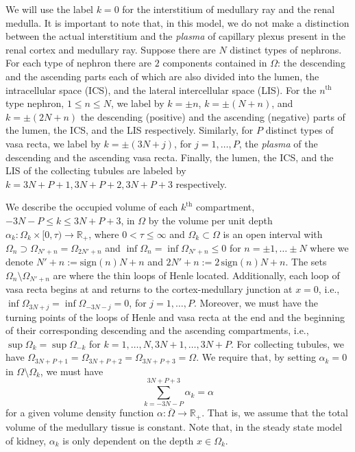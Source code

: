 \documentclass{article}
\begin{document}
We will use the label
$k=0$ for the interstitium of medullary ray and the renal medulla.
It is important to note that, in this model, we do not make a distinction between the actual interstitium and the \textit{plasma} of capillary plexus present in the renal cortex and medullary ray.
Suppose there are $N$ distinct types of nephrons.
For each type of nephron there are $2$ components contained in $\Omega$: the descending and the ascending parts each of which are also divided into the lumen, the intracellular space (ICS), and the lateral intercellular space (LIS).
For the $n^{\mathrm{th}}$ type nephron, $1\leq n\leq N$, we label by $k=\pm n$, $k=\pm(N+n)$, and $k=\pm(2N+n)$ the descending (positive) and the ascending (negative) parts of the lumen, the ICS, and the LIS respectively.
Similarly, for $P$ distinct types of vasa recta, we label by $k=\pm(3N+j)$, for $j=1,\dots,P$, the \textit{plasma} of the descending and the ascending vasa recta.
Finally, the lumen, the ICS, and the LIS of the collecting tubules are labeled by $k=3N+P+1,3N+P+2,3N+P+3$ respectively.

We describe the occupied volume of each $k^{\mathrm{th}}$ compartment, $-3N-P\leq k\leq 3N+P+3$, in $\Omega$ by the volume per unit depth $\alpha_k:\Omega_k\times [0,\tau)\to \mathbb{R}_+$, where $0<\tau\leq \infty$ and $\Omega_k\subset\Omega$ is an open interval with $\Omega_{n} \supset \Omega_{N'+n} = \Omega_{2N'+n}$ and $\inf\Omega_n = \inf\Omega_{N'+n}\leq 0$ for $n=\pm 1,\dots\pm N$ where we denote $N'+n := \mathrm{sign}(n)N+n$ and $2N'+n := 2\, \mathrm{sign}(n)N+n$.
The sets $\Omega_n\setminus \Omega_{N'+n}$ are where the thin loops of Henle located.
Additionally, each loop of vasa recta begins at and returns to the cortex-medullary junction at $x=0$, i.e., $\inf \Omega_{3N+j} = \inf \Omega_{-3N-j}=0$, for $j=1,\dots,P$.
Moreover, we must have the turning points of the loops of Henle and vasa recta at the end and the beginning of their corresponding descending and the ascending compartments, i.e., $\sup\Omega_k = \sup\Omega_{-k}$ for $k=1,\dots,N,3N+1,\dots,3N+P$.
For collecting tubules, we have $\Omega_{3N+P+1}=\Omega_{3N+P+2}=\Omega_{3N+P+3}=\Omega$.
We require that, by setting $\alpha_k=0$ in $\Omega\setminus\Omega_k$, we must have
\begin{equation}\label{eq:const_vol}
    \sum_{k=-3N-P}^{3N+P+3} \alpha_k = \alpha
\end{equation}
    for a given volume density function $\alpha:\overline{\Omega}\to\mathbb{R}_+$.
That is, we assume that the total volume of the medullary tissue is constant.
Note that, in the steady state model of kidney, $\alpha_k$ is only dependent on the depth $x\in \Omega_k$.
\end{document}
